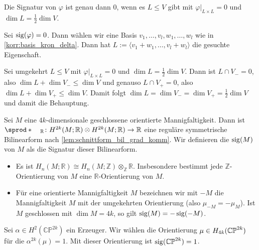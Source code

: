 \begin{lemma}[label=sig_null,{name=[{Äquivalenz dazu, dass die Signatur 0 ist}]}]
	Die Signatur von $\varphi$ ist genau dann $0$, wenn es $L \le V$ gibt mit $\varphi|_{L \times L}=0$ und $\dim L = \frac{1}{2} \dim V$.
\end{lemma}
\begin{beweis}
	Sei $\operatorname{sig}(\varphi)=0$. Dann wählen wir eine Basis $v_1,\ldots ,v_l,w_1,\ldots ,w_l$ wie in \autoref{korr:basis_kron_delta}.
	Dann hat $L := \langle v_1+ w_1, \ldots ,v_l+w_l\rangle$ die gesuchte Eigenschaft.
	
	Sei umgekehrt $L \le V$ mit $\varphi|_{L \times L}=0$ und $\dim L = \frac{1}{2} \dim V$.
	Dann ist $L \cap V_- =0$, also $\dim L + \dim V_- \le \dim V$ und genauso $L \cap V_+ =0$, also $\dim L + \dim V_+ \le \dim V$.
	Damit folgt $\dim L = \dim V_- = \dim V_+ = \frac{1}{2} \dim V$ und damit die Behauptung.
\end{beweis}

\begin{definition}[{name=[Signatur einer Mannigfaltigkeit]}]
	Sei $M$ eine $4k$-dimensionale geschlossene orientierte Mannigfaltigkeit.
	Dann ist $\sprod*{\enspace}{\enspace}_\mathbb{R} \colon H^{2k}(M;\mathbb{R}) \otimes H^{2k}(M;\mathbb{R}) \to \mathbb{R}$ eine reguläre symmetrische Bilinearform nach \autoref{lem:schnittform_bil_grad_komm}.
	Wir definieren die  $\operatorname{sig}(M)$ von $M$ als die Signatur dieser Bilinearform.
\end{definition}

\begin{bemerkung}[{name=[{über reelle Koeffizienten}]}]
	\leavevmode
	\begin{itemize}
		\item Es ist $H_n(M;\mathbb{R}) \cong H_n(M;\mathbb{Z})\otimes_\mathbb{Z} \mathbb{R}$.
		Insbesondere bestimmt jede $\mathbb{Z}$-Orientierung von $M$ eine $\mathbb{R}$-Orientierung von $M$.
		\item Für eine orientierte Mannigfaltigkeit $M$ bezeichnen wir mit $-M$ die Mannigfaltigkeit $M$ mit der umgekehrten Orientierung (also $\mu_{-M}=-\mu_M$).
		Ist $M$ geschlossen mit $\dim M = 4k$, so gilt $\operatorname{sig}(M)=- \operatorname{sig}(-M)$.
	\end{itemize}
\end{bemerkung}

\begin{beispiel}[{name=[{Signatur des komplex projektiven Raumes}]}]
	Sei $\alpha \in H^2(\mathbb{CP}^{2k})$ ein Erzeuger.
	Wir wählen die Orientierung $\mu \in H_{4k} (\mathbb{CP}^{2k})$ für die $\alpha^{2k} (\mu)=1$.
	Mit dieser Orientierung ist $\operatorname{sig} (\mathbb{CP}^{2k})=1$.
\end{beispiel}

